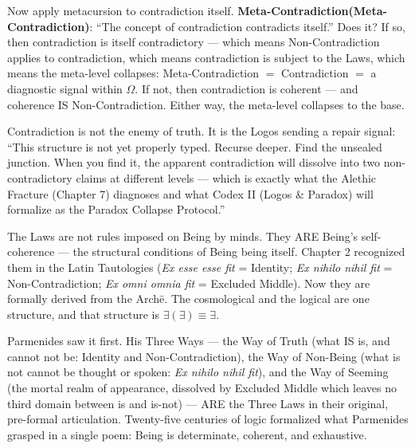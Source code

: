 \documentclass[10pt, openany, oneside]{book}
\begin{document}
\vspace{0.8em}

\noindent Now apply metacursion to contradiction itself. \textbf{Meta-Contradiction(Meta-Contradiction)}: ``The concept of contradiction contradicts itself.'' Does it? If so, then contradiction is itself contradictory --- which means Non-Contradiction applies to contradiction, which means contradiction is subject to the Laws, which means the meta-level collapses: Meta-Contradiction $=$ Contradiction $=$ a diagnostic signal within $\Omega$. If not, then contradiction is coherent --- and coherence IS Non-Contradiction. Either way, the meta-level collapses to the base.

Contradiction is not the enemy of truth. It is the Logos sending a repair signal: ``This structure is not yet properly typed. Recurse deeper. Find the unsealed junction. When you find it, the apparent contradiction will dissolve into two non-contradictory claims at different levels --- which is exactly what the Alethic Fracture (Chapter 7) diagnoses and what Codex II (Logos \& Paradox) will formalize as the Paradox Collapse Protocol.''

The Laws are not rules imposed on Being by minds. They ARE Being's self-coherence --- the structural conditions of Being being itself. Chapter 2 recognized them in the Latin Tautologies (\textit{Ex esse esse fit} = Identity; \textit{Ex nihilo nihil fit} = Non-Contradiction; \textit{Ex omni omnia fit} = Excluded Middle). Now they are formally derived from the Arch\={e}. The cosmological and the logical are one structure, and that structure is $\exists(\exists) \equiv \exists$.

Parmenides saw it first. His Three Ways --- the Way of Truth (what IS is, and cannot not be: Identity and Non-Contradiction), the Way of Non-Being (what is not cannot be thought or spoken: \textit{Ex nihilo nihil fit}), and the Way of Seeming (the mortal realm of appearance, dissolved by Excluded Middle which leaves no third domain between is and is-not) --- ARE the Three Laws in their original, pre-formal articulation. Twenty-five centuries of logic formalized what Parmenides grasped in a single poem: Being is determinate, coherent, and exhaustive.
\end{document}
